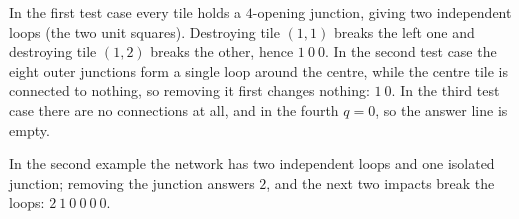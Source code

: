 In the first test case every tile holds a $4$-opening junction, giving two independent loops (the two unit squares). Destroying tile $(1,1)$ breaks the left one and destroying tile $(1,2)$ breaks the other, hence $1\ 0\ 0$. In the second test case the eight outer junctions form a single loop around the centre, while the centre tile is connected to nothing, so removing it first changes nothing: $1\ 0$. In the third test case there are no connections at all, and in the fourth $q = 0$, so the answer line is empty.

In the second example the network has two independent loops and one isolated junction; removing the junction answers $2$, and the next two impacts break the loops: $2\ 1\ 0\ 0\ 0\ 0$.
